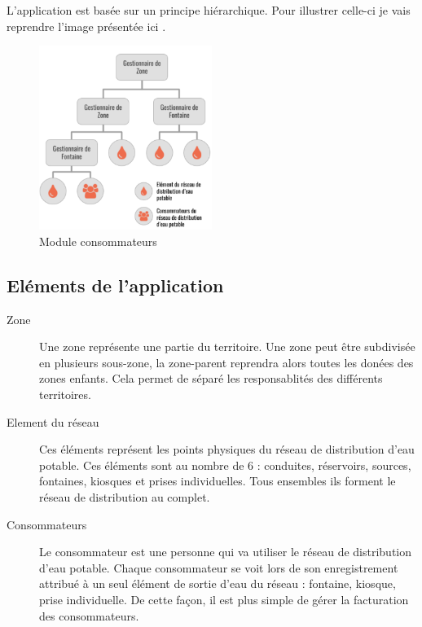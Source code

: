\documentclass{EPL-master-thesis-covers-FR}
\begin{document}
				L'application est basée sur un principe hiérarchique. Pour illustrer celle-ci je vais reprendre l'image présentée ici \cite{ref:haitiwater}. 
				
				\begin{figure}[H]
					\centering
					\includegraphics[width=0.5\textwidth]{images/hierarchie}
					\caption{Module consommateurs}
				\end{figure}
				
				
			\subsection{Eléments de l'application}
				\begin{description}
					\item[Zone] Une zone représente une partie du territoire. Une zone peut être subdivisée en plusieurs sous-zone, la zone-parent reprendra alors toutes les donées des zones enfants. Cela permet de séparé les responsablités des différents territoires.
					\item[Element du réseau] Ces éléments représent les points physiques du réseau de distribution d'eau potable. Ces éléments sont au nombre de 6 : conduites, réservoirs, sources, fontaines, kiosques et prises individuelles. Tous ensembles ils forment le réseau de distribution au complet. 
					\item[Consommateurs] Le consommateur est une personne qui va utiliser le réseau de distribution d'eau potable. Chaque consommateur se voit lors de son enregistrement attribué à un seul élément de sortie d'eau du réseau : fontaine, kiosque, prise individuelle. De cette façon, il est plus simple de gérer la facturation des consommateurs.
				\end{description}
				
			
				
				
\end{document}
